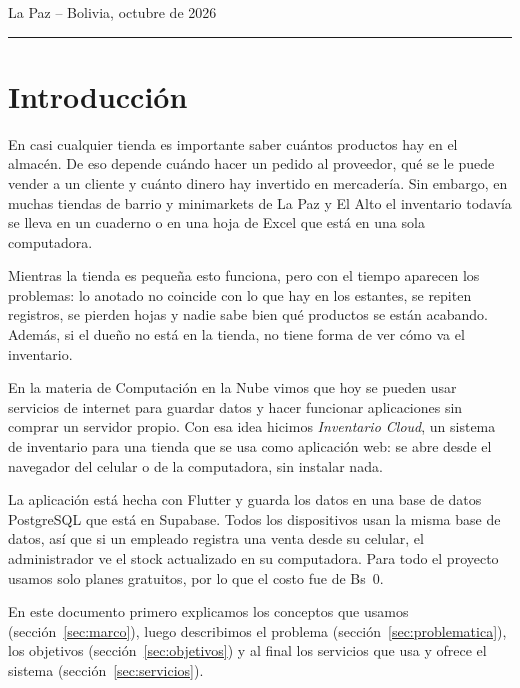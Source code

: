 \documentclass[12pt,a4paper]{article}
\begin{document}
\begin{titlepage}
  \vfill
  {La Paz -- Bolivia, octubre de 2026\par}
  \vspace{0.2cm}
  {\color{umsablue}\rule{0.88\textwidth}{1.1pt}\par}
\end{titlepage}


\section{Introducción}

En casi cualquier tienda es importante saber cuántos productos hay en el almacén. De eso depende cuándo hacer un pedido al proveedor, qué se le puede vender a un cliente y cuánto dinero hay invertido en mercadería. Sin embargo, en muchas tiendas de barrio y minimarkets de La Paz y El Alto el inventario todavía se lleva en un cuaderno o en una hoja de Excel que está en una sola computadora.

Mientras la tienda es pequeña esto funciona, pero con el tiempo aparecen los problemas: lo anotado no coincide con lo que hay en los estantes, se repiten registros, se pierden hojas y nadie sabe bien qué productos se están acabando. Además, si el dueño no está en la tienda, no tiene forma de ver cómo va el inventario.

En la materia de Computación en la Nube vimos que hoy se pueden usar servicios de internet para guardar datos y hacer funcionar aplicaciones sin comprar un servidor propio. Con esa idea hicimos \textit{Inventario Cloud}, un sistema de inventario para una tienda que se usa como aplicación web: se abre desde el navegador del celular o de la computadora, sin instalar nada.

La aplicación está hecha con Flutter y guarda los datos en una base de datos PostgreSQL que está en Supabase. Todos los dispositivos usan la misma base de datos, así que si un empleado registra una venta desde su celular, el administrador ve el stock actualizado en su computadora. Para todo el proyecto usamos solo planes gratuitos, por lo que el costo fue de Bs~0.

En este documento primero explicamos los conceptos que usamos (sección~\ref{sec:marco}), luego describimos el problema (sección~\ref{sec:problematica}), los objetivos (sección~\ref{sec:objetivos}) y al final los servicios que usa y ofrece el sistema (sección~\ref{sec:servicios}).
\end{document}
